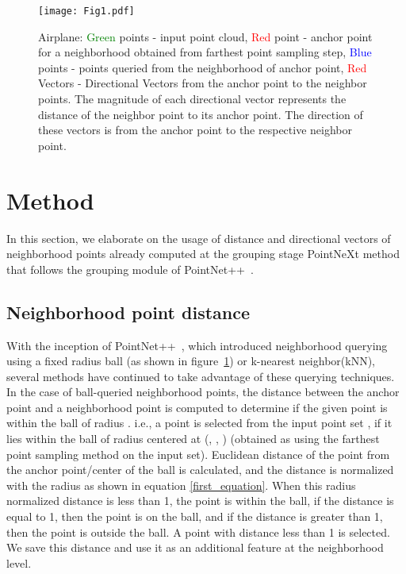 \documentclass[runningheads]{llncs}
\begin{document}
\begin{figure}[t]
\begin{center}
\texttt{[image: Fig1.pdf]}
\end{center}
  \caption{Airplane: \textcolor{green}{Green} points - input point cloud, \textcolor{red}{Red} point - anchor point for a neighborhood obtained from farthest point sampling step, \textcolor{blue}{Blue} points - points queried from the neighborhood of anchor point, \textcolor{red}{Red} Vectors - Directional Vectors from the anchor point to the neighbor points. The magnitude of each directional vector represents the distance of the neighbor point to its anchor point. The direction of these vectors is from the anchor point to the respective neighbor point.}
\label{Fig1}
\end{figure}

\section{Method}
In this section, we elaborate on the usage of distance and directional vectors of neighborhood points already computed at the grouping stage PointNeXt method that follows the grouping module of PointNet++~\cite{qi2017pointnet++}.

\subsection{Neighborhood point distance}
With the inception of PointNet++~\cite{qi2017pointnet++}, which introduced neighborhood querying using a fixed radius ball (as shown in figure~\ref{Fig1}) or k-nearest neighbor(kNN), several methods have continued to take advantage of these querying techniques. In the case of ball-queried neighborhood points, the distance between the anchor point and a neighborhood point is computed to determine if the given point is within the ball of radius . i.e., a point   is selected from the input point set , if it lies within the ball of radius  centered at (, , ) (obtained as  using the farthest point sampling method on the input  set). Euclidean distance  of the point from the anchor point/center of the ball is calculated, and the distance is normalized with the radius  as shown in equation \ref{first_equation}. When this radius normalized distance  is less than 1, the point is within the ball, if the distance is equal to 1, then the point is on the ball, and if the distance is greater than 1, then the point is outside the ball. A point with distance  less than 1 is selected. We save this distance and use it as an additional feature at the neighborhood level.
\end{document}
